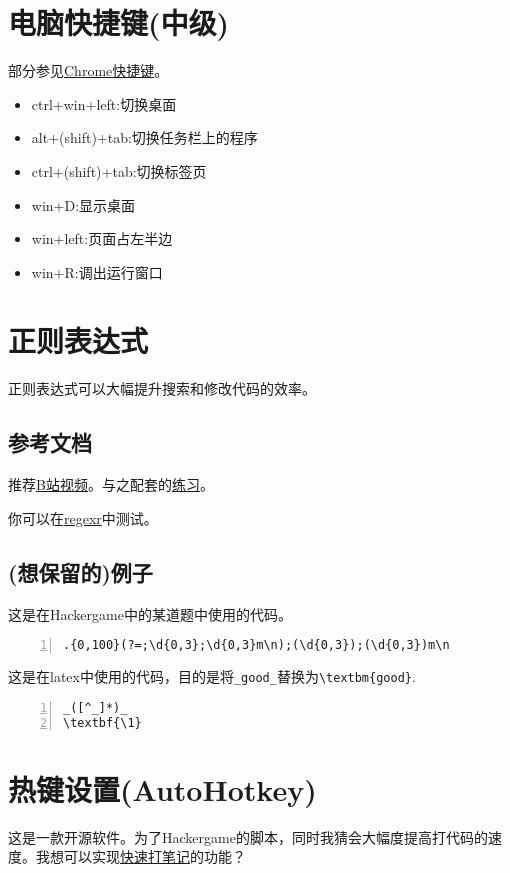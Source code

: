 \documentclass[11pt]{amsart}
\begin{document}
\section{电脑快捷键(中级)}
部分参见\href{https://zhuanlan.zhihu.com/p/42281412}{Chrome快捷键}。
\begin{itemize}
	\item  ctrl+win+left:切换桌面
	\item  alt+(shift)+tab:切换任务栏上的程序
	\item  ctrl+(shift)+tab:切换标签页
	\item  win+D:显示桌面
	\item  win+left:页面占左半边
	\item  win+R:调出运行窗口
\end{itemize} 
\section{正则表达式}
正则表达式可以大幅提升搜索和修改代码的效率。

\subsection{参考文档}
推荐\href{https://www.bilibili.com/video/BV19t4y1y7qP}{B站视频}。与之配套的\href{https://codejiaonang.com/#/course/regex_chapter1/}{练习}。

你可以在\href{https://regexr-cn.com/}{regexr}中测试。

\subsection{(想保留的)例子}
这是在Hackergame中的某道题中使用的代码。
\begin{lstlisting}[numbers=left,numberstyle=\tiny,numbersep=10pt]
.{0,100}(?=;\d{0,3};\d{0,3}m\n);(\d{0,3});(\d{0,3})m\n
\end{lstlisting}
这是在latex中使用的代码，目的是将\lstinline|_good_|替换为\lstinline|\textbm{good}|.
\begin{lstlisting}[numbers=left,numberstyle=\tiny,numbersep=10pt]
_([^_]*)_
\textbf{\1}
\end{lstlisting}

\section{热键设置(AutoHotkey)}
这是一款开源软件。为了Hackergame的脚本，同时我猜会大幅度提高打代码的速度。我想可以实现\href{https://zhuanlan.zhihu.com/p/60049290}{快速打笔记}的功能？
\end{document}
